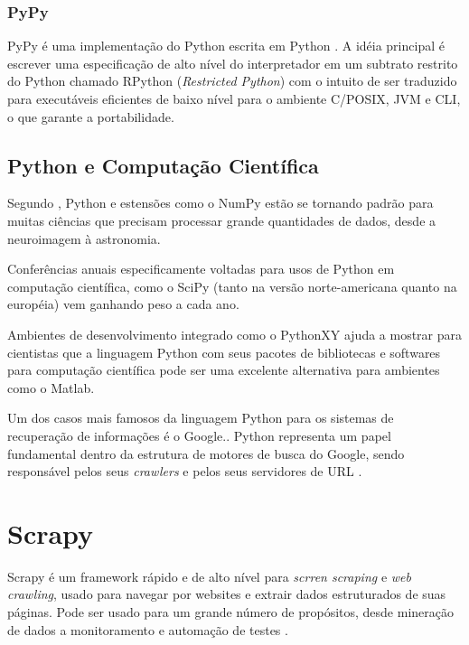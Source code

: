 \subsubsection{PyPy}

PyPy é uma implementação do Python escrita em Python \cite[p. 7]{pypy}. A idéia principal é escrever uma especificação de alto nível do interpretador em um subtrato restrito do Python chamado RPython (\emph{Restricted Python}) com o intuito de ser traduzido para executáveis eficientes de baixo nível para o ambiente C/POSIX, JVM e CLI, o que garante a portabilidade. 

\subsection{Python e Computação Científica}

Segundo \cite{python_scientific_world}, Python e estensões como o NumPy \cite{numpy} estão se tornando padrão para muitas ciências que precisam processar grande quantidades de dados, desde a neuroimagem à astronomia.

Conferências anuais especificamente voltadas para usos de Python em computação científica, como o SciPy \cite{scipy} (tanto na versão norte-americana quanto na européia) vem ganhando peso a cada ano.

Ambientes de desenvolvimento integrado como o PythonXY \cite{pythonxy} ajuda a mostrar para cientistas que a linguagem Python com seus pacotes de bibliotecas e softwares para computação científica pode ser uma excelente alternativa para ambientes como o Matlab. 

Um dos casos mais famosos da linguagem Python para os sistemas de recuperação de informações é o Google.\cite{google}. Python representa um papel fundamental dentro da estrutura de motores de busca do Google, sendo responsável pelos seus \emph{crawlers} e pelos seus servidores de URL \cite{surveyir}.

\pagebreak
\section{Scrapy}

Scrapy é um framework rápido e de alto nível para \emph{scrren scraping} e \emph{web crawling}, usado para navegar por websites e extrair dados estruturados de suas páginas. Pode ser usado para um grande número de propósitos, desde mineração de dados a monitoramento e automação de testes \cite{scrapy}.

